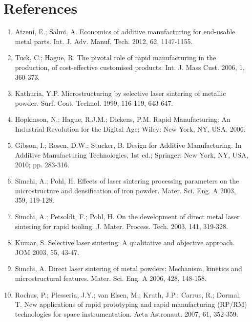 \documentclass[10pt]{article}
\begin{document}
\section*{References}
\begin{enumerate}
  \item Atzeni, E.; Salmi, A. Economics of additive manufacturing for end-usable metal parts. Int. J. Adv. Manuf. Tech. 2012, 62, 1147-1155.

  \item Tuck, C.; Hague, R. The pivotal role of rapid manufacturing in the production, of cost-effective customised products. Int. J. Mass Cust. 2006, 1, 360-373.

  \item Kathuria, Y.P. Microstructuring by selective laser sintering of metallic powder. Surf. Coat. Technol. 1999, 116-119, 643-647.

  \item Hopkinson, N.; Hague, R.J.M.; Dickens, P.M. Rapid Manufacturing: An Industrial Revolution for the Digital Age; Wiley: New York, NY, USA, 2006.

  \item Gibson, I.; Rosen, D.W.; Stucker, B. Design for Additive Manufacturing. In Additive Manufacturing Technologies, 1st ed.; Springer: New York, NY, USA, 2010; pp. 283-316.

  \item Simchi, A.; Pohl, H. Effects of laser sintering processing parameters on the microstructure and densification of iron powder. Mater. Sci. Eng. A 2003, 359, 119-128.

  \item Simchi, A.; Petsoldt, F.; Pohl, H. On the development of direct metal laser sintering for rapid tooling. J. Mater. Process. Tech. 2003, 141, 319-328.

  \item Kumar, S. Selective laser sintering: A qualitative and objective approach. JOM 2003, 55, 43-47.

  \item Simchi, A. Direct laser sintering of metal powders: Mechanism, kinetics and microstructural features. Mater. Sci. Eng. A 2006, 428, 148-158.

  \item Rochus, P.; Plesseria, J.Y.; van Elsen, M.; Kruth, J.P.; Carrus, R.; Dormal, T. New applications of rapid prototyping and rapid manufacturing (RP/RM) technologies for space instrumentation. Acta Astronaut. 2007, 61, 352-359.


\end{enumerate}
\end{document}
